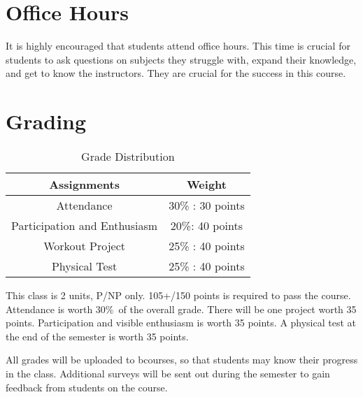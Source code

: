 \documentclass[letterpaper,12pt]{article}
\begin{document}
\section{Office Hours}
It is highly encouraged that students attend office hours. This time is crucial for students to ask questions on subjects they struggle with, expand their knowledge, and get to know the instructors. They are crucial for the success in this course. 




\section{Grading}
\begin{table}[ht]
\begin{center}
\caption{Grade Distribution}
\label{tbl:bins} %
\begin{tabular}{|cc|} 
\hline
\multicolumn{1}{|c}{Assignments} & \multicolumn{1}{c|}{Weight} \\
\hline
Attendance &   30\% : 30 points \\
Participation and Enthusiasm &   20\%: 40 points \\
Workout Project &   25\% : 40 points \\
Physical Test &  25\% : 40 points \\
\hline
\end{tabular}
\end{center}
\end{table}

This class is 2 units, P/NP only. 105+/150 points is required to pass the course.   Attendance is worth 30\%\ of the overall grade. There will be one project worth 35 points. Participation and visible enthusiasm is worth 35 points. A physical test at the end of the semester is worth 35 points.

All grades will be uploaded to bcourses, so that students may know their progress in the class. Additional surveys will be sent out during the semester to gain feedback from students on the course.
\\
\\
\\
\end{document}
